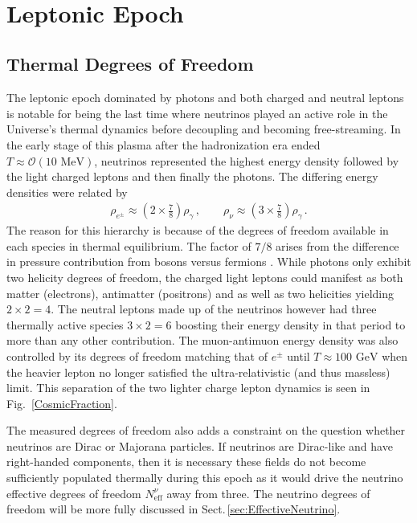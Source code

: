 \documentclass[universe,article,submit,moreauthors,pdftex,a4paper]{Definitions/mdpi}
\newcommand{\GeV}{\text{ GeV}}
\newcommand{\MeV}{\text{ MeV}}
\newcommand*{\rf}[1]{Fig.~{\ref{#1}}}
\newcommand*{\rsec}[1]{Sect.\,{\ref{#1}}}
\begin{document}
\\


\section{Leptonic Epoch} \label{sec:Leptonic}
\subsection{Thermal Degrees of Freedom}\label{sec:Freedom}
\noindent The leptonic epoch dominated by photons and both charged and neutral leptons is notable for being the last time where neutrinos played an active role in the Universe's thermal dynamics before decoupling and becoming free-streaming. In the early stage of this plasma after the hadronization era ended $T\approx\mathcal{O}(10\MeV)$, neutrinos represented the highest energy density followed by the light charged leptons and then finally the photons. The differing energy densities were related by
\begin{align}
\rho_{e^{\pm}}\approx\left(2\times\frac{7}{8}\right)\rho_{\gamma}\,,\qquad\rho_{\nu}\approx\left(3\times\frac{7}{8}\right)\rho_{\gamma}\,.
\end{align}
The reason for this hierarchy is because of the degrees of freedom \cite{Rafelski:2013yka} available in each species in thermal equilibrium. The factor of $7/8$ arises from the difference in pressure contribution from bosons versus fermions \cite{Rafelski:2013yka}. While photons only exhibit two helicity degrees of freedom, the charged light leptons could manifest as both matter (electrons), antimatter (positrons) and as well as two helicities yielding $2\times2=4$. The neutral leptons made up of the neutrinos however had three thermally active species $3\times2=6$ boosting their energy density in that period to more than any other contribution. The muon-antimuon energy density was also controlled by its degrees of freedom matching that of $e^{\pm}$ until $T\approx100\GeV$ when the heavier lepton no longer satisfied the ultra-relativistic (and thus massless) limit. This separation of the two lighter charge lepton dynamics is seen in \rf{CosmicFraction}.

The measured degrees of freedom also adds a constraint on the question whether neutrinos are Dirac or Majorana particles. If neutrinos are Dirac-like and have right-handed components, then it is necessary these fields do not become sufficiently populated thermally during this epoch as it would drive the neutrino effective degrees of freedom $N^{\nu}_{\mathrm{eff}}$ away from three. The neutrino degrees of freedom will be more fully discussed in \rsec{sec:EffectiveNeutrino}.
\end{document}
